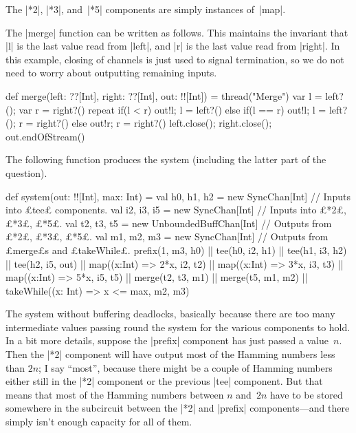 
\begin{answerI}
The |*2|, |*3|, and~|*5| components are simply instances of~|map|.

The |merge| function can be written as follows.  This maintains the invariant
that  |l| is the last value read from |left|, and |r| is the last value read
from |right|.  In this example, closing of channels is just used to signal
termination, so we do not need to worry about outputting remaining inputs.
%
\begin{scala}
  def merge(left: ??[Int], right: ??[Int], out: !![Int]) = thread("Merge"){
    var l = left?(); var r = right?()
    repeat{
      if(l < r){ out!l; l = left?() }
      else if(l == r){ out!l; l = left?(); r = right?() }
      else{ out!r; r = right?() }
    }
    left.close(); right.close(); out.endOfStream()
  }
\end{scala}

The following function produces the system (including the latter part of the
question).
%
\begin{scala}
def system(out: !![Int], max: Int) = {
  val h0, h1, h2 = new SyncChan[Int]     // Inputs into £tee£ components.
  val i2, i3, i5 = new SyncChan[Int]     // Inputs into £*2£, £*3£, £*5£.
  val t2, t3, t5 = new UnboundedBuffChan[Int] // Outputs from £*2£, £*3£, £*5£.
  val m1, m2, m3 = new SyncChan[Int]    // Outputs from £merge£s and £takeWhile£.
  prefix(1, m3, h0) || tee(h0, i2, h1) || tee(h1, i3, h2) || tee(h2, i5, out) ||
  map((x:Int) => 2*x, i2, t2) || map((x:Int) => 3*x, i3, t3) || 
  map((x:Int) => 5*x, i5, t5) ||  
  merge(t2, t3, m1) || merge(t5, m1, m2) || 
  takeWhile((x: Int) => x <= max, m2, m3)
}
\end{scala}

The system without buffering deadlocks, basically because there are too many
intermediate values passing round the system for the various components to
hold.  In a bit more details, suppose the |prefix| component has just passed
a value~$n$.  Then the |*2| component will have output most of the Hamming
numbers less than $2n$; I say ``most'', because there might be a couple of
Hamming numbers either still in the |*2| component or the previous |tee|
component.  But that means that most of the Hamming numbers between $n$
and~$2n$ have to be stored somewhere in the subcircuit between the |*2| and
|prefix| components---and there simply isn't enough capacity for all of them. 
 

\end{answerI}
